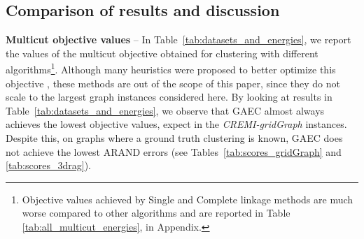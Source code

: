 \begin{table}[t]
    \label{tab:scores}
\end{table}

\subsection{Comparison of results and discussion}\label{sec:experiments_discussion}

\textbf{Multicut objective values} -- In Table~\ref{tab:datasets_and_energies}, we report the values of the multicut objective obtained for clustering with different \algname{} algorithms\footnote{Objective values achieved by Single and Complete linkage methods are much worse compared to other algorithms and are reported in Table \ref{tab:all_multicut_energies}, in Appendix.}. Although many heuristics were proposed to better optimize this objective \cite{beier2016efficient,beier2014cut,kernighan1970efficient}, these methods are out of the scope of this paper, since they do not scale to the largest graph instances considered here. By looking at results in Table~\ref{tab:datasets_and_energies}, we observe that GAEC almost always achieves the lowest objective values, expect in the \emph{CREMI-gridGraph} instances. Despite this, on graphs where a ground truth clustering is known, GAEC does not achieve the lowest ARAND errors (see Tables~\ref{tab:scores_gridGraph} and \ref{tab:scores_3drag}). 

